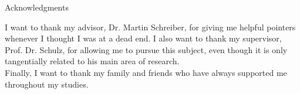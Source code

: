 \thispagestyle{empty}

\vspace*{20mm}

\begin{center}
{ Acknowledgments}
\end{center}

\vspace{10mm}

\noindent
I want to thank my advisor, Dr. Martin Schreiber, for giving me helpful pointers whenever I thought I was at a dead end.
I also want to thank my supervisor, Prof. Dr. Schulz, for allowing me to pursue this subject, even though it is only tangentially related to his main area of research.\\
Finally, I want to thank my family and friends who have always supported me throughout my studies.

\cleardoublepage{}
